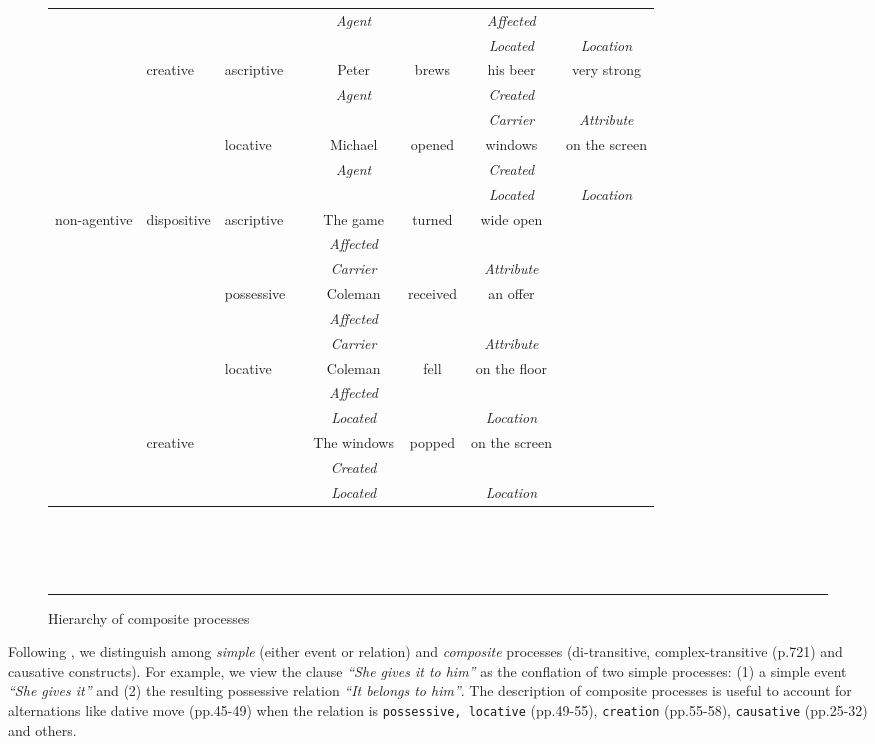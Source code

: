 \begin{figure*} [p]
\begin{tabular}{|l|l|l|l|cccc|}
& & & & {\em Agent} & & {\em Affected} &\\
& & & & & & {\em Located} & {\em Location}\\\cline{2-3}\cline{5-8}
& creative & ascriptive & & Peter & brews & his beer & very strong\\
& & & & {\em Agent} & & {\em Created} &\\
& & & & & & {\em Carrier} & {\em Attribute}\\\cline{3-3}\cline{5-8}
& & locative & & Michael & opened & windows & on the screen\\
& & & & {\em Agent} & & {\em Created} &\\
& & & & & & {\em Located} & {\em Location}\\\cline{1-3}\cline{5-8}
non-agentive & dispositive & ascriptive & & The game & turned & wide open &\\ 
& & & & {\em Affected} & & &\\
& & & & {\em Carrier} & & {\em Attribute} &\\\cline{3-3}\cline{5-8}
& & possessive & & Coleman & received & an offer &\\ 
& & & & {\em Affected} & & &\\
& & & & {\em Carrier} & & {\em Attribute} &\\\cline{3-3}\cline{5-8}
& & locative & & Coleman & fell & on the floor &\\
& & & & {\em Affected} & & &\\
& & & & {\em Located} & & {\em Location} &\\\cline{2-2}\cline{5-8}
& creative & & & The windows & popped & on the screen &\\ 
& & & & {\em Created} & & &\\
& & & & {\em Located} & & {\em Location} &\\\hline
\end{tabular}\\\\\\
\caption{Hierarchy of composite processes}
\label{compound-proc}
\rule{\textwidth}{.01in}
\end{figure*}

Following \cite{fawcett}, we distinguish among {\em simple} (either event or
relation) and {\em composite} processes (di-transitive, complex-transitive
\cite{quirk-et-al85} (p.721) and causative constructs). For example, we view
the clause {\em ``She gives it to him''} as the conflation of two simple
processes: (1) a simple event {\em ``She gives it''} and (2) the resulting
possessive relation {\em ``It belongs to him''}.  The description of composite
processes is useful to account for alternations like dative move
\cite{levin} (pp.45-49) when the relation is {\tt possessive, locative}
(pp.49-55), {\tt creation} (pp.55-58), {\tt causative} (pp.25-32) and others.

